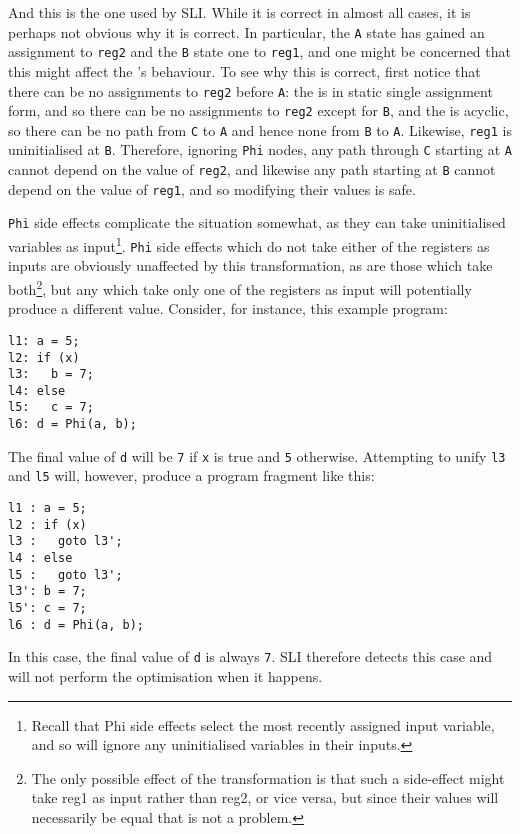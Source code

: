 And this is the one used by SLI.  While it is correct in almost all
cases, it is perhaps not obvious why it is correct.  In particular,
the \verb|A| state has gained an assignment to \verb|reg2| and the
\verb|B| state one to \verb|reg1|, and one might be concerned that
this might affect the \StateMachine's behaviour.  To see why this is
correct, first notice that there can be no assignments to \verb|reg2|
before \verb|A|: the \StateMachine is in static single assignment
form, and so there can be no assignments to \verb|reg2| except for
\verb|B|, and the \StateMachine is acyclic, so there can be no path
from \verb|C| to \verb|A| and hence none from \verb|B| to \verb|A|.
Likewise, \verb|reg1| is uninitialised at \verb|B|.  Therefore,
ignoring \verb|Phi| nodes, any path through \verb|C| starting at
\verb|A| cannot depend on the value of \verb|reg2|, and likewise any
path starting at \verb|B| cannot depend on the value of \verb|reg1|,
and so modifying their values is safe.

\verb|Phi| side effects complicate the situation somewhat, as they can
take uninitialised variables as input\footnote{Recall that Phi side
  effects select the most recently assigned input variable, and so
  will ignore any uninitialised variables in their inputs.}.
\verb|Phi| side effects which do not take either of the registers as
inputs are obviously unaffected by this transformation, as are those
which take both\footnote{The only possible effect of the
  transformation is that such a side-effect might take reg1 as input
  rather than reg2, or vice versa, but since their values will
  necessarily be equal that is not a problem.}, but any which take
only one of the registers as input will potentially produce a
different value.  Consider, for instance, this example program:

\begin{verbatim}
l1: a = 5;
l2: if (x)
l3:   b = 7;
l4: else
l5:   c = 7;
l6: d = Phi(a, b);
\end{verbatim}

The final value of \verb|d| will be \verb|7| if \verb|x| is true and
\verb|5| otherwise.  Attempting to unify \verb|l3| and \verb|l5| will,
however, produce a program fragment like this:

\begin{verbatim}
l1 : a = 5;
l2 : if (x)
l3 :   goto l3';
l4 : else
l5 :   goto l3';
l3': b = 7;
l5': c = 7;
l6 : d = Phi(a, b);
\end{verbatim}

In this case, the final value of \verb|d| is always \verb|7|.  SLI
therefore detects this case and will not perform the optimisation when
it happens.

